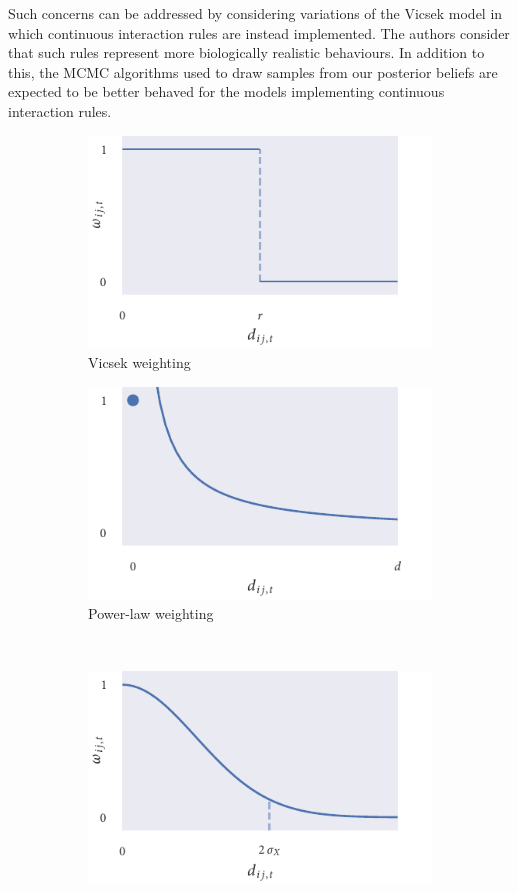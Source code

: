 Such concerns can be addressed by considering variations of the Vicsek model in which
continuous interaction rules are instead implemented. The authors consider that such rules
represent more biologically realistic behaviours. In addition to this, the MCMC algorithms
used to draw samples from our posterior beliefs are expected to be better behaved for the
models implementing continuous interaction rules.

\begin{figure}[tb]
    \begin{subfigure}[b]{0.5\textwidth}
        \caption{Vicsek weighting}
        \label{fig:vicsek_weight}
        \includegraphics{vicsek_weighting.pdf}
    \end{subfigure}%
    \begin{subfigure}[b]{0.5\textwidth}
        \caption{Power-law weighting}
        \label{fig:power_weight}
        \includegraphics{power_weighting.pdf}
    \end{subfigure}\\
    \begin{subfigure}[b]{0.5\textwidth}
        \includegraphics{gaussian_weighting.pdf}

\end{subfigure}
\end{figure}
